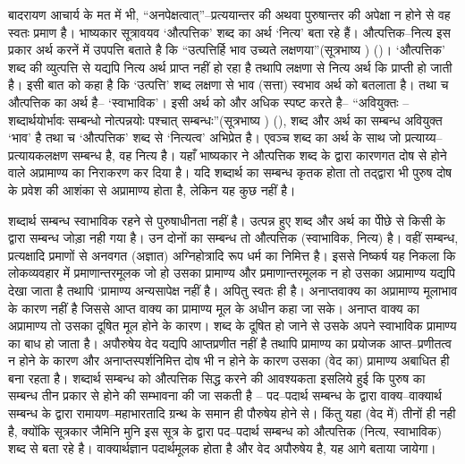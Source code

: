 बादरायण आचार्य के मत में भी, “अनपेक्षत्वात्”–प्रत्ययान्तर की अथवा पुरुषान्तर की अपेक्षा न होने से वह स्वतः प्रमाण है। भाष्यकार सूत्रावयव ‘औत्पत्तिक' शब्द का अर्थ ‘नित्य' बता रहे हैं। औत्पत्तिक–नित्य इस प्रकार अर्थ करनें में उपपत्ति बताते है कि “उत्पत्तिर्हि भाव उच्यते लक्षणया”(सूत्रभाष्य ) ()। ‘औत्पत्तिक’ शब्द की व्युत्पत्ति से यद्यपि नित्य अर्थ प्राप्त नहीं हो रहा है तथापि लक्षणा से नित्य अर्थ कि प्राप्ती हो जाती है। इसी बात को कहा है कि ‘उत्पत्ति' शब्द लक्षणा से भाव (सत्ता) स्वभाव अर्थ को बतलाता है। तथा च औत्पत्तिक का अर्थ है– ‘स्वाभाविक'। इसी अर्थ को और अधिक स्पष्ट करते है– “अवियुक्तः – शब्दार्थयोर्भावः सम्बन्धो नोत्पन्नयोः पश्चात् सम्बन्धः”(सूत्रभाष्य ) (), शब्द और अर्थ का सम्बन्ध अवियुक्त ‘भाव' है तथा च ‘औत्पत्तिक' शब्द से ‘नित्यत्व' अभिप्रेत है। एवञ्च शब्द का अर्थ के साथ जो प्रत्याय्य–प्रत्यायकलक्षण सम्बन्ध है, वह नित्य है। यहाँ भाष्यकार ने औत्पत्तिक शब्द के द्वारा कारणगत दोष से होने वाले अप्रामाण्य का निराकरण कर दिया है। यदि शब्दार्थ का सम्बन्ध कृतक होता तो तद्द्वारा भी पुरुष दोष के प्रवेश की आशंका से अप्रामाण्य होता है, लेकिन यह कुछ नहीं है। 

शब्दार्थ सम्बन्ध स्वाभाविक रहने से पुरुषाधीनता नहीं है। उत्पन्न हुए शब्द और अर्थ का पीेछे से किसी के द्वारा सम्बन्ध जोड़ा नही गया है। उन दोनों का सम्बन्ध तो औत्पत्तिक (स्वाभाविक, नित्य) है। वहीं सम्बन्ध, प्रत्यक्षादि प्रमाणों से अनवगत (अज्ञात) अग्निहोत्रादि रूप धर्म का निमित्त है। इससे निष्कर्ष यह निकला कि लोकव्यवहार में प्रमाणान्तरमूलक जो हो उसका प्रामाण्य और प्रमाणान्तरमूलक न हो उसका अप्रामाण्य यद्यपि देखा जाता है तथापि ‘प्रामाण्य अन्यसापेक्ष नहीं है। अपितु स्वतः ही है। अनाप्तवाक्य का अप्रामाण्य मूलाभाव के कारण नहीं है जिससे आप्त वाक्य का प्रामाण्य मूल के अधीन कहा जा सके। अनाप्त वाक्य का अप्रामाण्य तो उसका दूषित मूल होने के कारण। शब्द के दूषित हो जाने से उसके अपने स्वाभाविक प्रामाण्य का बाध हो जाता है। अपौरुषेय वेद यद्यपि आप्तप्रणीत नहीं है तथापि प्रामाण्य का प्रयोजक आप्त–प्रणीतत्व न होने के कारण और अनाप्तस्पर्शनिमित्त दोष भी न होने के कारण उसका (वेद का) प्रामाण्य अबाधित ही बना रहता है। शब्दार्थ सम्बन्ध को औत्पत्तिक सिद्ध करने की आवश्यकता इसलिये हुई कि पुरुष का सम्बन्ध तीन प्रकार से होने की सम्भावना की जा सकती है –  पद–पदार्थ सम्बन्ध के द्वारा  वाक्य–वाक्यार्थ सम्बन्ध के द्वारा  रामायण–महाभारतादि ग्रन्थ के समान ही पौरुषेय होने से। किंतु यहा (वेद में) तीनों ही नही है, क्योंकि सूत्रकार जैमिनि मुनि इस सूत्र के द्वारा पद–पदार्थ सम्बन्ध को औत्पत्तिक (नित्य, स्वाभाविक) शब्द से बता रहे है। वाक्यार्थज्ञान पदार्थमूलक होता है और वेद अपौरुषेय है, यह आगे बताया जायेगा। 

